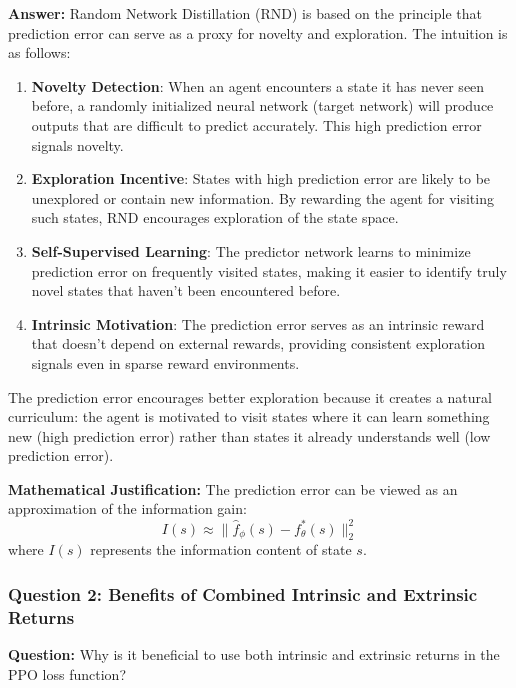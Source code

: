\documentclass[12pt]{article}
\begin{document}
{{{\textbf{Answer:} Random Network Distillation (RND) is based on the principle that prediction error can serve as a proxy for novelty and exploration. The intuition is as follows:

\begin{enumerate}
    \item \textbf{Novelty Detection}: When an agent encounters a state it has never seen before, a randomly initialized neural network (target network) will produce outputs that are difficult to predict accurately. This high prediction error signals novelty.
    
    \item \textbf{Exploration Incentive}: States with high prediction error are likely to be unexplored or contain new information. By rewarding the agent for visiting such states, RND encourages exploration of the state space.
    
    \item \textbf{Self-Supervised Learning}: The predictor network learns to minimize prediction error on frequently visited states, making it easier to identify truly novel states that haven't been encountered before.
    
    \item \textbf{Intrinsic Motivation}: The prediction error serves as an intrinsic reward that doesn't depend on external rewards, providing consistent exploration signals even in sparse reward environments.
\end{enumerate}

The prediction error encourages better exploration because it creates a natural curriculum: the agent is motivated to visit states where it can learn something new (high prediction error) rather than states it already understands well (low prediction error).

\textbf{Mathematical Justification:} The prediction error can be viewed as an approximation of the information gain:
\begin{equation}
I(s) \approx \|\hat{f}_\phi(s) - f^*_\theta(s)\|_2^2
\end{equation}
where $I(s)$ represents the information content of state $s$.
    
\subsubsection{Question 2: Benefits of Combined Intrinsic and Extrinsic Returns}

\textbf{Question:} Why is it beneficial to use both intrinsic and extrinsic returns in the PPO loss function?

}}}
\end{document}

